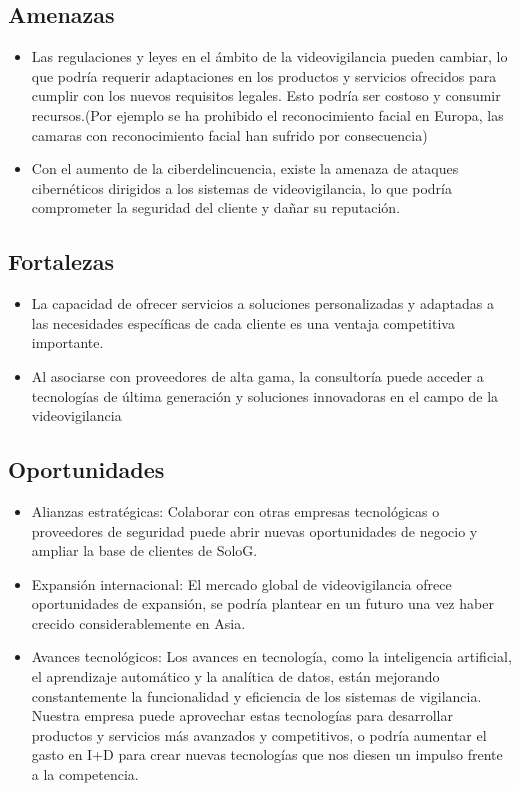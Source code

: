 \documentclass{report}
\begin{document}
        \subsection*{Amenazas}
            \begin{itemize}
                \item Las regulaciones y leyes en el ámbito de la videovigilancia pueden cambiar, lo que podría requerir adaptaciones en los productos y servicios ofrecidos para cumplir con los nuevos requisitos legales. Esto podría ser costoso y consumir recursos.(Por ejemplo se ha prohibido el reconocimiento facial en Europa, las camaras con reconocimiento facial han sufrido por consecuencia)
                \item Con el aumento de la ciberdelincuencia, existe la amenaza de ataques cibernéticos dirigidos a los sistemas de videovigilancia, lo que podría comprometer la seguridad del cliente y dañar su reputación.
            \end{itemize}
        \subsection*{Fortalezas}
            \begin{itemize}
                \item La capacidad de ofrecer servicios a soluciones personalizadas y adaptadas a las necesidades específicas de cada cliente es una ventaja competitiva importante.
                \item Al asociarse con proveedores de alta gama, la consultoría puede acceder a tecnologías de última generación y soluciones innovadoras en el campo de la videovigilancia
            \end{itemize}
        \subsection*{Oportunidades}
            \begin{itemize}
                \item Alianzas estratégicas: Colaborar con otras empresas tecnológicas o proveedores de seguridad puede abrir nuevas oportunidades de negocio y ampliar la base de clientes de SoloG.
                \item Expansión internacional: El mercado global de videovigilancia ofrece oportunidades de expansión, se podría plantear en un futuro una vez haber crecido considerablemente en Asia.
                \item Avances tecnológicos: Los avances en tecnología, como la inteligencia artificial, el aprendizaje automático y la analítica de datos, están mejorando constantemente la funcionalidad y eficiencia de los sistemas de vigilancia. Nuestra empresa puede aprovechar estas tecnologías para desarrollar productos y servicios más avanzados y competitivos, o podría aumentar el gasto en I+D para crear nuevas tecnologías que nos diesen un impulso frente a la competencia.
            \end{itemize}
      
\end{document}
